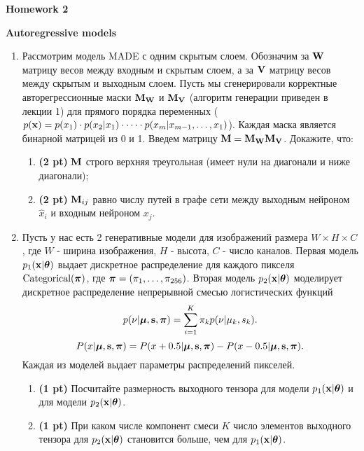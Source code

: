 \documentclass{article}
\begin{document}
\begin{center}
    {\Large \textbf{Homework 2}} \\
\end{center}

{\large \textbf{Autoregressive models}}
\begin{enumerate}
    \item Рассмотрим модель MADE с одним скрытым слоем. Обозначим за $\mathbf{W}$ матрицу весов между входным и скрытым слоем, а за $\mathbf{V}$ матрицу весов между скрытым и выходным слоем. Пусть мы сгенерировали корректные авторегрессионные маски $\mathbf{M}_{\mathbf{W}}$ и $\mathbf{M}_{\mathbf{V}}$ (алгоритм генерации приведен в лекции 1) для прямого порядка переменных ($p(\mathbf{x}) = p(x_1) \cdot p(x_2 | x_1) \cdot \dots \cdot p(x_m | x_{m-1}, \dots, x_1)$). Каждая маска является бинарной матрицей из 0 и 1. Введем матрицу $\mathbf{M} = \mathbf{M}_{\mathbf{W}} \mathbf{M}_{\mathbf{V}}$. Докажите, что:
    \begin{enumerate}
    	\item  \textbf{(2 pt)} $\mathbf{M}$ строго верхняя треугольная (имеет нули на диагонали и ниже диагонали);
    	\item  \textbf{(2 pt)} $\mathbf{M}_{ij}$ равно числу путей в графе сети между выходным нейроном $\hat{x}_i$ и входным нейроном $x_j$.
    \end{enumerate}
    \item Пусть у нас есть 2 генеративные модели для изображений размера $W \times H \times C$, где $W$ - ширина изображения, $H$ - высота, $C$ - число каналов. Первая модель $p_1(\mathbf{x} | \boldsymbol{\theta})$ выдает дискретное распределение для каждого пикселя $\text{Categorical}(\boldsymbol{\pi})$, где $\boldsymbol{\pi} = (\pi_1, \dots,  \pi_{256})$. Вторая модель $p_2(\mathbf{x} | \boldsymbol{\theta})$ моделирует дискретное распределение непрерывной смесью логистических функций
   		\[
  				p(\nu | \boldsymbol{\mu}, \mathbf{s}, \boldsymbol{\pi}) = \sum_{i=1}^K \pi_k p(\nu | \mu_k, s_k).
		\]
    	\[
    		P(x | \boldsymbol{\mu}, \mathbf{s}, \boldsymbol{\pi}) = P(x + 0.5 | \boldsymbol{\mu}, \mathbf{s}, \boldsymbol{\pi}) - P(x - 0.5 | \boldsymbol{\mu}, \mathbf{s}, \boldsymbol{\pi}).
    	\]
    Каждая из моделей выдает параметры распределений пикселей.
    	\begin{enumerate}
    		\item \textbf{(1 pt)} Посчитайте размерность выходного тензора для модели $p_1(\mathbf{x} | \boldsymbol{\theta})$ и для модели $p_2(\mathbf{x} | \boldsymbol{\theta})$. 
    		\item \textbf{(1 pt)} При каком числе компонент смеси $K$ число элементов выходного тензора для $p_2(\mathbf{x} | \boldsymbol{\theta})$ становится больше, чем для $p_1(\mathbf{x} | \boldsymbol{\theta})$.
    	\end{enumerate}
\end{enumerate}
\end{document}
